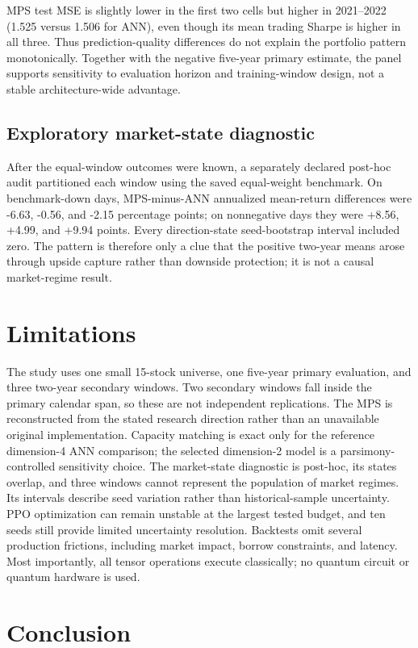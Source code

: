 \documentclass[conference]{IEEEtran}
\begin{document}
MPS test MSE is slightly lower in the first two cells but higher in
2021--2022 (1.525 versus 1.506 for ANN), even though its mean trading Sharpe
is higher in all three. Thus prediction-quality differences do not explain
the portfolio pattern monotonically. Together with the negative five-year
primary estimate, the panel supports sensitivity to evaluation horizon and
training-window design, not a stable architecture-wide advantage.


\subsection{Exploratory market-state diagnostic}

After the equal-window outcomes were known, a separately declared post-hoc
audit partitioned each window using the saved equal-weight benchmark. On
benchmark-down days, MPS-minus-ANN annualized mean-return differences were
-6.63, -0.56, and -2.15 percentage points; on nonnegative days they were
+8.56, +4.99, and +9.94 points. Every direction-state seed-bootstrap interval
included zero. The pattern is therefore only a clue that the positive
two-year means arose through upside capture rather than downside protection;
it is not a causal market-regime result.
\section{Limitations}

The study uses one small 15-stock universe, one five-year primary evaluation,
and three two-year secondary windows. Two secondary windows fall inside the
primary calendar span, so these are not independent replications.
The MPS is reconstructed from the stated research direction rather than an
unavailable original implementation. Capacity matching is exact only for the
reference dimension-4 ANN comparison; the selected dimension-2 model is a
parsimony-controlled sensitivity choice. The market-state diagnostic is
post-hoc, its states overlap, and three windows cannot represent the population
of market regimes. Its intervals describe seed variation rather than
historical-sample uncertainty. PPO optimization can remain unstable at the
largest tested budget, and ten seeds still provide limited uncertainty
resolution. Backtests omit several production frictions, including market
impact, borrow constraints, and latency. Most importantly, all tensor
operations execute classically; no quantum circuit or quantum hardware is
used.

\section{Conclusion}
\end{document}
